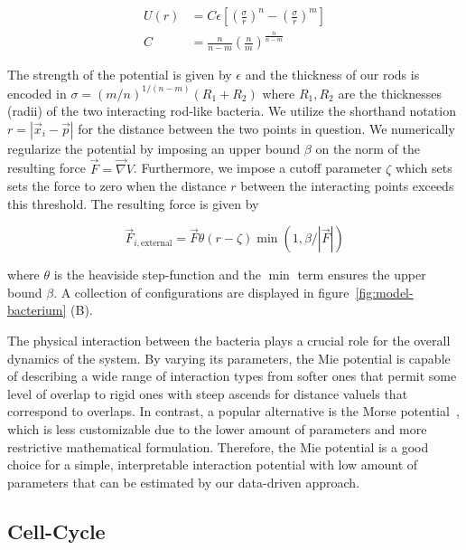 \documentclass{article}
\begin{document}
\begin{align}
    U(r) &= C\epsilon\left[ \left(\frac{\sigma}{r}\right)^n -
        \left(\frac{\sigma}{r}\right)^m\right]\\
    C &= \frac{n}{n-m}\left(\frac{n}{m}\right)^{\frac{n}{n-m}}
\end{align}

The strength of the potential is given by $\epsilon$ and the thickness of our rods
is encoded in $\sigma = (m/n)^{1/(n-m)}(R_1+R_2)$ where $R_1,R_2$ are the thicknesses (radii) of the
two interacting rod-like bacteria.
We utilize the shorthand notation $r=|\vec{x}_i - \vec{p}|$ for the distance between the two points
in question.
We numerically regularize the potential by imposing an upper bound $\beta$ on the norm of the
resulting force $\vec{F} = \vec{\nabla} V$.
Furthermore, we impose a cutoff parameter $\zeta$ which sets sets the force to zero when the
distance $r$ between the interacting points exceeds this threshold.
The resulting force is given by

\begin{equation}
    \vec{F}_{i,\text{external}} = \vec{F} \theta(r-\zeta) \min\left(1, \beta / |\vec{F}|\right)
\end{equation}

where $\theta$ is the heaviside step-function and the $\min$ term ensures the upper bound $\beta$.
A collection of configurations are displayed in figure~\ref{fig:model-bacterium} (B).

The physical interaction between the bacteria plays a crucial role for the overall dynamics of the
system.
By varying its parameters, the Mie potential is capable of describing a wide range of interaction
types from softer ones that permit some level of overlap to rigid ones with steep ascends for
distance valuels that correspond to overlaps.
In contrast, a popular alternative is the Morse potential~\cite{Morse1929}, which is less
customizable due to the lower amount of parameters and more restrictive mathematical formulation.
Therefore, the Mie potential is a good choice for a simple, interpretable interaction potential with
low amount of parameters that can be estimated by our data-driven approach.

\subsection{Cell-Cycle}
\end{document}
